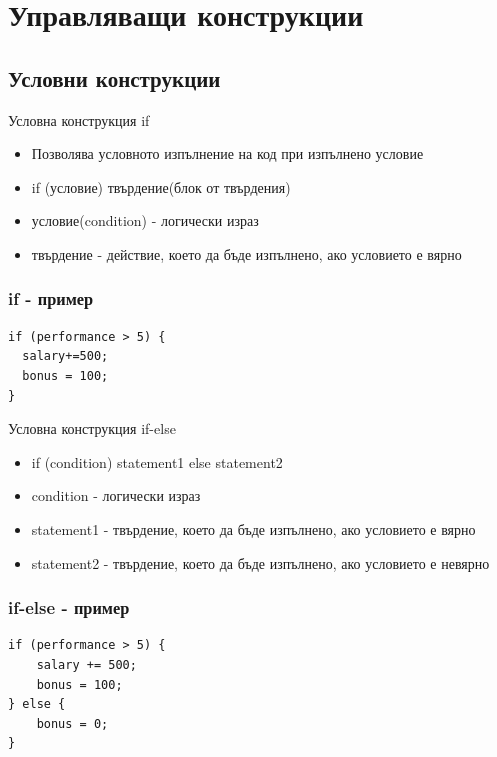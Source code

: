 \documentclass{beamer}
\begin{document}
\section{Управляващи конструкции}
\subsection{Условни конструкции}

\begin{frame}{Условна конструкция if}
  \transdissolve
  \begin{itemize}
  \item Позволява условното изпълнение на код при изпълнено условие
  \item if (условие) твърдение(блок от твърдения)
  \item условие(condition) - логически израз
  \item твърдение - действие, което да бъде
    изпълнено, ако условието е вярно
  \end{itemize}
\end{frame}

\begin{frame}[fragile]
  \frametitle{if - пример}
  \transdissolve
\begin{lstlisting}
if (performance > 5) {
  salary+=500;
  bonus = 100;
}
\end{lstlisting}
\end{frame}

\begin{frame}{Условна конструкция if-else}
  \transdissolve
  \begin{itemize}
  \item if (condition) statement1 else statement2
  \item condition - логически израз
  \item statement1 - твърдение, което да бъде
      изпълнено, ако условието е вярно
  \item statement2 - твърдение, което да бъде
    изпълнено, ако условието е невярно
  \end{itemize}
\end{frame}

\begin{frame}[fragile]
  \frametitle{if-else - пример}
  \transdissolve
\begin{lstlisting}
if (performance > 5) {
    salary += 500;
    bonus = 100;
} else {
    bonus = 0;
}
\end{lstlisting}
\end{frame}
\end{document}
